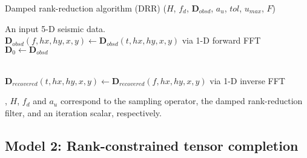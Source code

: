 \begin{algorithm}[H] \caption{Damped rank-reduction algorithm (DRR) ({${H}$}, {${f}_{d}$}, $\mathbf{D}_{obsd}$, $a_{u}$, $tol$, $u_{max}$, ${F}$)}
	\label{alg:alg1}
	\begin{algorithmic}[1] 
\Require An input 5-D seismic data.\\

$\mathbf{D}_{obsd}(f, hx, hy, x, y)\leftarrow \mathbf{D}_{obsd}(t, hx, hy, x, y)$ via 1-D forward FFT\\		    
$\mathbf{D}_0\leftarrow\mathbf{D}_{obsd}$\;

\EndFor\\
$\mathbf{D}_{recovered}(t,hx, hy, x, y)\leftarrow \mathbf{D}_{recovered}(f,hx, hy, x, y)$ via 1-D inverse FFT\;
	\end{algorithmic}
\end{algorithm}

, ${H}$, ${f}_{d}$ and $a_{u}$ correspond to the sampling operator, the damped rank-reduction filter, and an iteration scalar, respectively. 

\subsection{Model 2: Rank-constrained tensor completion}

